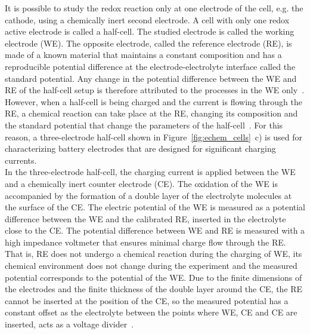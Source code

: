 It is possible to study the redox reaction only at one electrode of the cell, e.g. the cathode, using a chemically inert second electrode. A cell with only one redox active electrode is called a half-cell. The studied electrode is called the working electrode (WE). The opposite electrode, called the reference electrode (RE), is made of a known material that maintains a constant composition and has a reproducible potential difference at the electrode-electrolyte interface called the standard potential. Any change in the potential difference between the WE and RE of the half-cell setup is therefore attributed to the processes in the WE only~\cite{Bard_book}.\\
However, when a half-cell is being charged and the current is flowing through the RE, a chemical reaction can take place at the RE, changing its composition and the standard potential that change the parameters of the half-cell~\cite{Bard_book,DOM}. For this reason, a three-electrode half-cell shown in Figure~\ref{fig:echem_cells}~c) is used for characterizing battery electrodes that are designed for significant charging currents.\\

In the three-electrode half-cell, the charging current is applied between the WE and a chemically inert counter electrode (CE). The oxidation of the WE is accompanied by the formation of a double layer of the electrolyte molecules at the surface of the CE. The electric potential of the WE is measured as a potential difference between the WE and the calibrated RE, inserted in the electrolyte close to the CE. The potential difference between WE and RE is measured with a high impedance voltmeter that ensures minimal charge flow through the RE. That is, RE does not undergo a chemical reaction during the charging of WE, its chemical environment does not change during the experiment and the measured potential corresponds to the potential of the WE. Due to the finite dimensions of the electrodes and the finite thickness of the double layer around the CE, the RE cannot be inserted at the position of the CE, so the measured potential has a constant offset as the electrolyte between the points where WE, CE and CE are inserted, acts as a voltage divider~\cite{Bard_book}.\\

